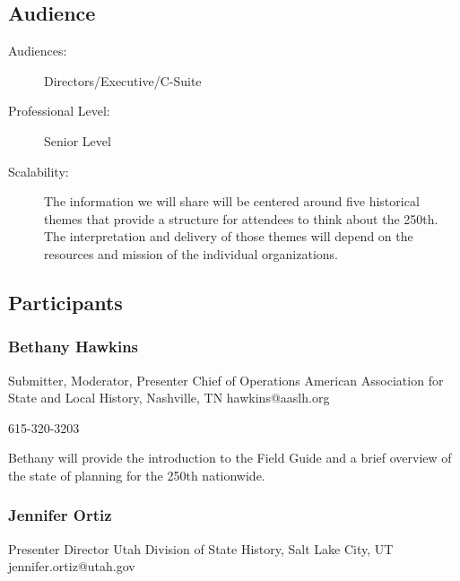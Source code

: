 \documentclass{report}
\begin{document}
              \subsection*{Audience}
                \begin{description}
                  \item [Audiences:]Directors/Executive/C-Suite~
                  \item[Professional Level:]Senior Level~
                \item[Scalability:] The information we will share will be centered around five historical themes that provide a structure for attendees to think about the 250th. The interpretation and delivery of those themes will depend on the resources and mission of the individual organizations.

							
              \end{description}
            \subsection*{Participants}
              \subsubsection*{ Bethany Hawkins }
              Submitter, Moderator, Presenter\newline
              Chief of Operations\newline
              American Association for State and Local History, Nashville, TN
              \newline
              hawkins@aaslh.org\newline
              
              615-320-3203\newline

              Bethany will provide the introduction to the Field Guide and a brief overview of the state of planning for the 250th nationwide.\newline


              

              
                \subsubsection*{ Jennifer  Ortiz }
                Presenter\newline
                Director\newline
                Utah Division of State History, Salt Lake City, UT
                \newline
                jennifer.ortiz@utah.gov\newline
                
\end{document}

